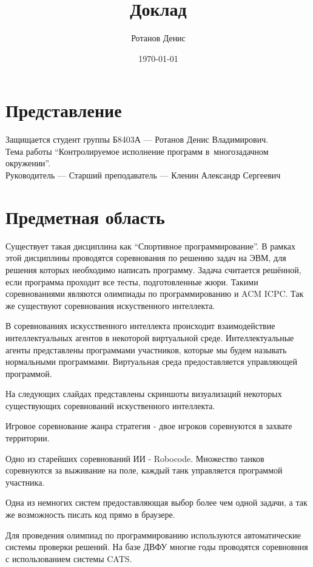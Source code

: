\documentclass[a4paper,14pt]{extarticle}
\title{Доклад}
\author{Ротанов Денис}
\date{\today}
\begin{document}
\maketitle

\section{Представление}

Защищается студент группы Б8403А --- Ротанов Денис Владимирович.\\
Тема работы ``Контролируемое исполнение программ в~многозадачном окружении''.\\
Руководитель --- Старший преподаватель --- Кленин Александр Сергеевич


\section{Предметная область}

Существует такая дисциплина как ``Спортивное программирование''. В рамках этой дисциплины проводятся соревнования по решению задач на ЭВМ, для решения которых необходимо написать программу. Задача считается решённой, если программа проходит все тесты, подготовленные жюри. Такими соревнованиями являются олимпиады по программированию и ACM ICPC. Так же существуют соревнования искуственного интеллекта.

В соревнованиях искусственного интеллекта происходит взаимодействие интеллектуальных агентов в некоторой виртуальной среде. Интеллектуальные агенты представлены программами участников, которые мы будем называть нормальными программами. Виртуальная среда предоставляется управляющей программой.

На следующих слайдах представлены скриншоты визуализаций некоторых существующих соревнований искуственного интеллекта.

Игровое соревнование жанра стратегия - двое игроков соревнуются в захвате территории.

Одно из старейших соревнований ИИ - Robocode. Множество танков соревнуются за выживание на поле, каждый танк управляется программой участника.

Одна из немногих систем предоставляющая выбор более чем одной задачи, а так же возможность писать код прямо в браузере.

Для проведения олимпиад по программированию используются автоматические системы проверки решений. На базе ДВФУ многие годы проводятся соревновния с использованием системы CATS.
\end{document}
